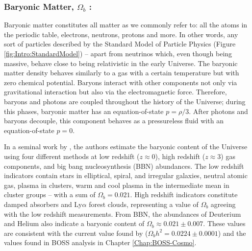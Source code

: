 \subsubsection{Baryonic Matter, $\Omega_b$ :}
Baryonic matter constitutes all matter as we commonly refer to: all the atoms in the periodic table, electrons, neutrons, protons and more. In other words, any sort of particles described by the Standard Model of Particle Physics (Figure \ref{fig:Intro:StandardModel}) -- apart from neutrinos which, even though being massive, behave close to being relativistic in the early Universe. The baryonic matter density behaves similarly to a gas with a certain temperature but with zero chemical potential. Baryons interact with other components not only via gravitational interaction but also via the electromagnetic force. Therefore, baryons and photons are coupled throughout the history of the Universe; during this phases, baryonic matter has an equation-of-state $p = \rho/3$. After photons and baryons decouple, this component behaves as a pressureless fluid with an equation-of-state $p=0$. 

\qquad In a seminal work by \cite{1998BaryonContent}, the authors estimate the baryonic content of the Universe using four different methods at low redshift ($z \approx 0$), high redshift ($z\approx 3$) gas components, and big bang nucleosynthesis (BBN) abundances. The low redshift indicators contain stars in elliptical, spiral, and irregular galaxies, neutral atomic gas, plasma in clusters, warm and cool plasma in the intermediate mean in cluster groups -- with a sum of $\Omega_b = 0.021$. High redshift indicators constitute damped absorbers and Ly$\alpha$ forest clouds, representing a value of $\Omega_b$ agreeing with the low redshift measurements. From BBN, the abundances of Deuterium and Helium also indicate a baryonic content of $\Omega_b \approx 0.021\pm 0.007$. These values are consistent with the current value found by \cite{2018PlanckCosmology} ($\Omega_b h^2 = 0.0224 \pm 0.0001$) and the values found in BOSS analysis in Chapter \ref{Chap:BOSS-Cosmo}.

